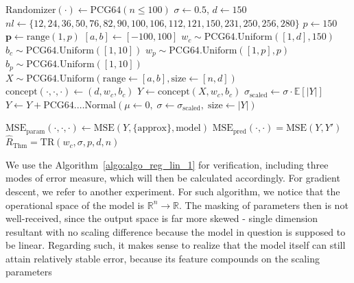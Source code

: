 \documentclass[10pt]{article} %
\begin{document}
\begin{algorithm}[htb]
    \caption{Linear regression with Gaussian white noise, full control.}
    \Begin
    {
    $\mathrm{Randomizer}(\cdot)\gets\mathrm{PCG64}(n\leq 100)$
    $\sigma\gets 0.5$, $d\gets 150$
    $nl\gets\{12,24,36,50,76,82,90,100,106,112,121,150,231,250,256,280\}$
    $p\gets 150$
    $\mathbf{p}\gets \mathrm{range}(1,p)$\; $[a,b]\gets [-100,100]$\;
    $w_{c}\sim \mathrm{PCG64}.\mathrm{Uniform}([1,d],150)$\; $b_{c}\sim \mathrm{PCG64}.\mathrm{Uniform}([1,10])$\;
    $w_{p}\sim \mathrm{PCG64}.\mathrm{Uniform}([1,p],p)$\; $b_{p}\sim \mathrm{PCG64}.\mathrm{Uniform}([1,10])$\;
    $X\sim\mathrm{PCG64}.\mathrm{Uniform}(\mathrm{range}\gets[a,b],\mathrm{size}\gets[n,d])$
    $\mathrm{concept}(\cdot,\cdot,\cdot)\gets (d,w_{c},b_{c})$\;
    $Y \gets \mathrm{concept}(X, w_{c},b_{c})$\;
    $\sigma_{\mathrm{scaled}} \gets \sigma \cdot \mathbb{E}\left[\lvert Y\rvert\right]$\;
    $Y \gets Y + \mathrm{PCG64}.…\mathrm{Normal}\left(\mu\gets 0,\;\sigma\gets \sigma_{\mathrm{scaled}},\;\mathrm{size}\gets\lvert Y\rvert\right)$ 

    $\mathrm{MSE}_{\mathrm{param}}(\cdot,\cdot,\cdot)\gets \mathrm{MSE}(Y,\{\mathrm{approx}\},\mathrm{model})$\;
    $\mathrm{MSE}_{\mathrm{pred}}(\cdot,\cdot)=\mathrm{MSE}(Y,Y')$
    $\hat{R}_{\mathrm{Thm}}=\mathrm{TR}(w_{c},\sigma,p,d,n)$\;
    }
    \label{algo:algo_reg_lin_1}
\end{algorithm}

We use the Algorithm~\ref{algo:algo_reg_lin_1} for verification, including three modes of error measure, which will then be calculated accordingly. For gradient descent, we refer to another experiment. For such algorithm, we notice that the operational space of the model is $\mathbb{R}^{n}\to \mathbb{R}$. The masking of parameters then is not well-received, since the output space is far more skewed - single dimension resultant with no scaling difference because the model in question is supposed to be linear. Regarding such, it makes sense to realize that the model itself can still attain relatively stable error, because its feature compounds on the scaling parameters
\end{document}
